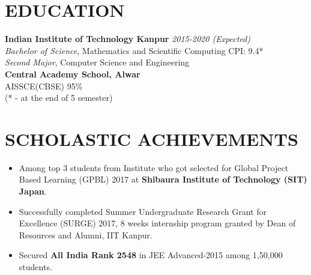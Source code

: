 \documentclass[margin]{res}
\begin{document}
\begin{resume}

\section{EDUCATION}
\textbf{Indian Institute of Technology Kanpur} \hfill \textit{2015-2020 (Expected)}\\
{\sl Bachelor of Science}, Mathematics and Scientific Computing \hfill CPI: 
9.4*
\\
{\sl Second Major}, Computer Science and Engineering \\
\textbf{Central Academy School, Alwar}\\
AISSCE(CBSE) \hfill 95\% \\
{\small (* -  at the end of 5 semester)}
\section{SCHOLASTIC ACHIEVEMENTS}
\begin{itemize}
\item Among top 3 students from Institute who got selected for Global Project Based Learning (GPBL) 2017 at
\textbf{Shibaura Institute of Technology (SIT) Japan}.
\item Successfully completed Summer Undergraduate Research Grant for Excellence (SURGE) 2017, 8 weeks internship program granted by Dean of Resources and Alumni, IIT Kanpur.
\item Secured \textbf{All India Rank 2548} in JEE Advanced-2015 among 1,50,000 students.
\end{itemize}


\end{resume}
\end{document}
